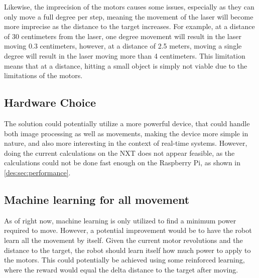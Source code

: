 Likewise, the imprecision of the motors causes some issues, especially as they can only move a full degree per step, meaning the movement of the laser will become more imprecise as the distance to the target increases.
For example, at a distance of 30 centimeters from the laser, one degree movement will result in the laser moving 0.3 centimeters, however, at a distance of 2.5 meters, moving a single degree will result in the laser moving more than 4 centimeters.
This limitation means that at a distance, hitting a small object is simply not viable due to the limitations of the motors.

\subsection{Hardware Choice}
The solution could potentially utilize a more powerful device, that could handle both image processing as well as movements, making the device more simple in nature, and also more interesting in the context of real-time systems.
However, doing the current calculations on the NXT does not appear feasible, as the calculations could not be done fast enough on the Raspberry Pi, as shown in \autoref{des:sec:performance}.
 
\subsection{Machine learning for all movement}
As of right now, machine learning is only utilized to find a minimum power required to move.
However, a potential improvement would be to have the robot learn all the movement by itself.
Given the current motor revolutions and the distance to the target, the robot should learn itself how much power to apply to the motors.
This could potentially be achieved using some reinforced learning, where the reward would equal the delta distance to the target after moving.
